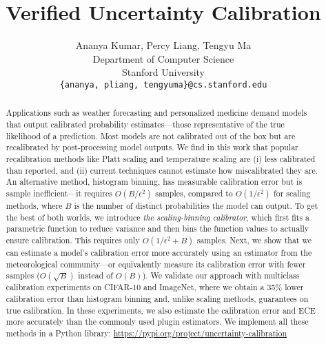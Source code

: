 \documentclass{article}
\title{Verified Uncertainty Calibration}
\author{%
  Ananya Kumar, Percy Liang, Tengyu Ma \\
  Department of Computer Science\\
  Stanford University\\
  \texttt{\{ananya, pliang, tengyuma\}@cs.stanford.edu} \\
}
\newcommand{\ourcal}[0]{the scaling-binning calibrator}
\begin{document}
\maketitle

\begin{abstract}
  Applications such as weather forecasting and personalized medicine demand models that output calibrated probability estimates---those representative of the true likelihood of a prediction. Most models are not calibrated out of the box but are recalibrated by post-processing model outputs. We find in this work that popular recalibration methods like Platt scaling and temperature scaling are (i) less calibrated than reported, and (ii) current techniques cannot estimate how miscalibrated they are. An alternative method, histogram binning, has measurable calibration error but is sample inefficient---it requires $O(B/\epsilon^2)$ samples, compared to $O(1/\epsilon^2)$ for scaling methods, where $B$ is the number of distinct probabilities the model can output. To get the best of both worlds, we introduce \emph{\ourcal{}}, which first fits a parametric function to reduce variance and then bins the function values to actually ensure calibration. This requires only $O(1/\epsilon^2 + B)$ samples.
  Next, we show that we can estimate a model's calibration error more accurately using an estimator from the meteorological community---or equivalently measure its calibration error with fewer samples ($O(\sqrt{B})$ instead of $O(B)$).
  We validate our approach with multiclass calibration experiments on CIFAR-10 and ImageNet, where we obtain a 35\% lower calibration error than histogram binning and, unlike scaling methods, guarantees on true calibration.
  In these experiments, we also estimate the calibration error and ECE more accurately than the commonly used plugin estimators.
  We implement all these methods in a Python library: \url{https://pypi.org/project/uncertainty-calibration}


\end{abstract}
\end{document}
